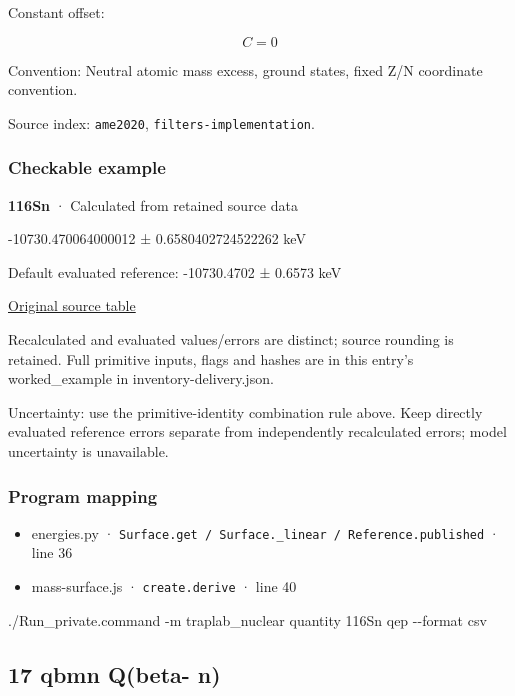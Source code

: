 \documentclass[
  11pt,
  letterpaper,
]{article}
\newenvironment{Shaded}{}{}
\newcommand{\AttributeTok}[1]{\textcolor[rgb]{0.49,0.56,0.16}{#1}}
\newcommand{\ExtensionTok}[1]{#1}
\newcommand{\NormalTok}[1]{#1}
\providecommand{\tightlist}{%
  \setlength{\itemsep}{0pt}\setlength{\parskip}{0pt}}
\begin{document}
Constant offset:

\[
C=0
\]

Convention: Neutral atomic mass excess, ground states, fixed Z/N
coordinate convention.

Source index: \texttt{ame2020}, \texttt{filters-implementation}.

\subsubsection{Checkable example}\label{checkable-example-15}

\textbf{116Sn} · Calculated from retained source data

-10730.470064000012 ± 0.6580402724522262 keV

Default evaluated reference: -10730.4702 ± 0.6573 keV

\href{https://www-nds.iaea.org/amdc/ame2020/rct1.mas20.txt}{Original
source table}

Recalculated and evaluated values/errors are distinct; source rounding
is retained. Full primitive inputs, flags and hashes are in this entry's
worked\_example in inventory-delivery.json.

Uncertainty: use the primitive-identity combination rule above. Keep
directly evaluated reference errors separate from independently
recalculated errors; model uncertainty is unavailable.

\subsubsection{Program mapping}\label{program-mapping-15}

\begin{itemize}
\tightlist
\item
  energies.py ·
  \texttt{Surface.get\ /\ Surface.\_linear\ /\ Reference.published} ·
  line 36
\item
  mass-surface.js · \texttt{create.derive} · line 40
\end{itemize}

\begin{Shaded}
\begin{Highlighting}[]
\ExtensionTok{./Run\_private.command} \AttributeTok{{-}m}\NormalTok{ traplab\_nuclear quantity 116Sn qep }\AttributeTok{{-}{-}format}\NormalTok{ csv}
\end{Highlighting}
\end{Shaded}

\subsection{17 qbmn Q(beta- n)}\label{qbmn-qbeta--n}
\end{document}
